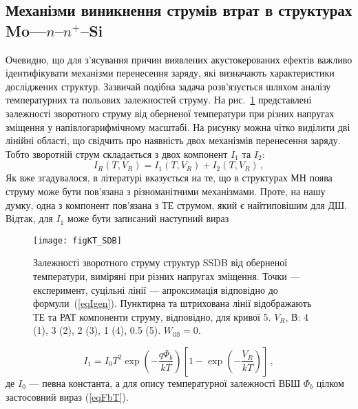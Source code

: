 \subsection{Механізми виникнення струмів втрат в структурах Mo---$n$--$n^+$--Si\label{LeakCur}}

Очевидно, що для з'ясування причин виявлених акустокерованих ефектів важливо ідентифікувати
механізми перенесення заряду, які визначають характеристики досліджених структур.
Зазвичай подібна задача розв'язується шляхом аналізу температурних та польових залежностей струму.
На рис.~\ref{figKT_SDB} представлені залежності зворотного струму від оберненої температури при різних напругах зміщення
у напівлогарифмічному масштабі.
На рисунку можна чітко виділити дві лінійні області, що свідчить про наявність двох механізмів
перенесення заряду.
Тобто зворотній струм складається з двох компонент $I_{1}$ та $I_2$:
\begin{equation}\label{eqIsum}
    I_R(T,V_R)=I_1(T,V_R)+I_2(T,V_R)\,,
\end{equation}
Як вже згадувалося, в літературі вказується на те, що в структурах МН поява струму може бути пов'язана з
різноманітними механізмами.
Проте, на нашу думку, одна з компонент пов'язана з ТЕ струмом, який є найтиповішим для ДШ.
Відтак, для $I_1$ може бути записаний наступний вираз

\begin{figure}
\center
\texttt{[image: figKT\_SDB]}
\caption{\label{figKT_SDB}
Залежності зворотного струму структур SSDB від оберненої температури,
виміряні при різних напругах зміщення.
Точки --- експеримент,
суцільні лінії --- апроксимація відповідно до формули~(\ref{eqIgen}).
Пунктирна та штрихована лінії відображають ТЕ та РАТ компоненти струму, відповідно, для кривої 5.
$V_R$, В: 4 (1), 3 (2), 2 (3), 1 (4), 0.5 (5).
$W_\mathtt{US}=0$.
}%
\end{figure}

\begin{equation}\label{eqIte_SDB}
    I_1=I_0T^2\exp\left(-\frac{q\Phi_b}{kT}\right)\left[1-\exp\left(-\frac{V_R}{kT}\right)\right]\,,
\end{equation}
де $I_0$ --- певна константа,
а для опису температурної залежності ВБШ $\Phi_b$ цілком застосовний вираз (\ref{eqFbT}).

